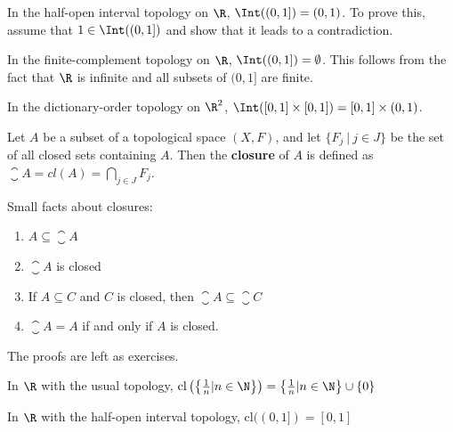 \begin{example}
 In the half-open interval topology on $\R$, $\Int((0,1])=(0,1)$. To prove this, assume that $1\in
  \Int((0,1])$ and show that it leads to a contradiction.
\end{example}

\begin{example}
In the finite-complement topology on $\R$, $\Int((0,1])= \emptyset$. This follows from the fact that $\R$ is infinite and all subsets of $(0,1]$ are finite.
\end{example}

\begin{example}
In the dictionary-order topology on $\R^2$, $\Int( [ 0,1] \times [ 0,1] ) = [0,1] \times (0,1)$.
\placeholder
\end{example}

\begin{definition}
 Let $A$ be a subset of a topological space $(X,F)$, and let $\{ F_j\ |\ j \in J \}$ be the set of all closed sets containing $A$. Then the {\bf closure} of $A$ is defined as $\closure{A} = cl(A) = \bigcap_{j \in J}F_j$.
\end{definition}


\begin{smallfact}
Small facts about closures:
\begin{enumerate}
\item $A \subseteq \closure{A}$
\item $\closure{A}$ is closed
\item If $A \subseteq C$ and $C$ is closed, then $\closure{A}\subseteq\closure{C}$
\item $\closure{A}=A$ if and only if $A$ is closed.
\end{enumerate}
\end{smallfact}
The proofs are left as exercises.


\begin{example}
 In $\R$ with the usual topology, $\mathrm{cl}\left(\left\{ \frac{1}{n}|n \in \N \right\}\right) = \left\{\frac{1}{n}|n \in \N \right\} \cup \{ 0\}$
\end{example}

\begin{example}
In $\R$ with the half-open interval topology, $\mathrm{cl}((0,1])=[ 0, 1]$
\end{example}


